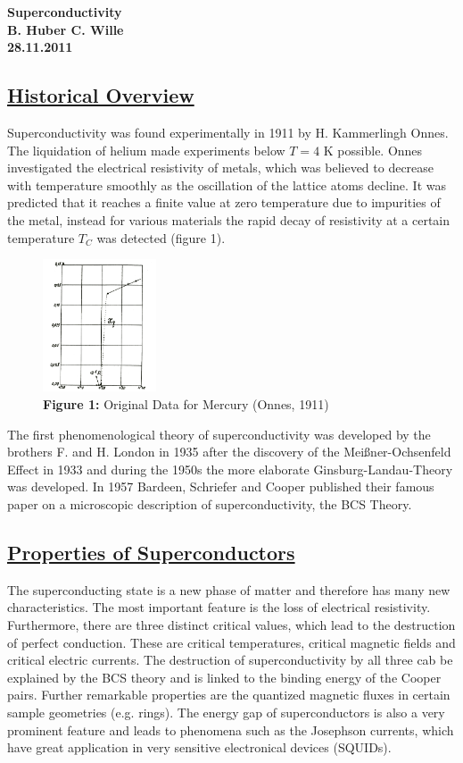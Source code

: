 \documentclass[a4paper]{scrartcl}
\numberwithin{equation}{section}
\numberwithin{figure}{section}
\numberwithin{table}{section}
\newcommand{\ssubsection}[1]{{ \subsection*{\linebreak \centering\bf\underline {#1}}}}
\begin{document}
\begin{center}
\Huge \bf \sc Superconductivity \\
\large B. Huber \quad C. Wille \\
\small 28.11.2011
\end{center}
\small
\ssubsection{Historical Overview}
Superconductivity was found experimentally in 1911 by H. Kammerlingh Onnes. The liquidation of helium made experiments below $T=4$ K possible. Onnes investigated the electrical resistivity of metals, which was believed to decrease with temperature smoothly as the oscillation of the lattice atoms decline. It was predicted that it reaches a finite value at zero temperature due to impurities of the metal, instead for various materials the rapid decay of resistivity at a certain temperature $T_C$ was detected (figure 1). 

\begin{figure}
\includegraphics[width=0.3\textwidth]{img/heikemess.png}
\caption*{\textbf{Figure 1: }\small Original Data for Mercury (Onnes, 1911) \cite{buckel}}
\label{fig:onnes}
\end{figure}

The first phenomenological theory of superconductivity was developed by the brothers F. and H. London in 1935 after the discovery of the Meißner-Ochsenfeld Effect in 1933 and during the 1950s the more elaborate Ginsburg-Landau-Theory was developed. In 1957 Bardeen, Schriefer and Cooper published their famous paper on a microscopic description of superconductivity, the BCS Theory.

\ssubsection{Properties of Superconductors}
The superconducting state is a new phase of matter and therefore has many new characteristics. The most important feature is the loss of electrical resistivity. Furthermore, there are three distinct critical values, which lead to the destruction of perfect conduction. These are critical temperatures, critical magnetic fields and critical electric currents. The destruction of superconductivity by all three cab be explained by the BCS theory and is linked to the binding energy of the Cooper pairs. Further remarkable properties are the quantized magnetic fluxes in certain sample geometries (e.g. rings). The energy gap of superconductors is also a very prominent feature and leads to phenomena such as the Josephson currents, which have great application in very sensitive electronical devices (SQUIDs). 
\end{document}
